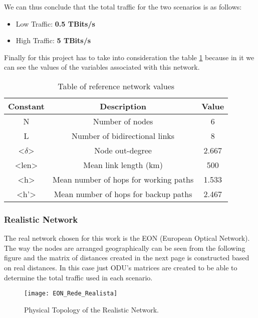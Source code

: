 We can thus conclude that the total traffic for the two scenarios is as follows:
\begin{itemize}
  \item Low Traffic: \textbf{0.5 TBits/s}
  \item High Traffic: \textbf{5 TBits/s}
\end{itemize}

Finally for this project has to take into consideration the table \ref{table:5} because in it we can see the values of the variables associated with this network.
\begin{table}[h!]
\centering
\begin{tabular}{|| c | c | c||}
 \hline
 Constant & Description & Value \\
 \hline\hline
 N & Number of nodes & 6 \\
 L & Number of bidirectional links & 8 \\
 <$\delta$> & Node out-degree & 2.667 \\
 <len> & Mean link length (km) & 500 \\
 <h> & Mean number of hops for working paths & 1.533 \\
 <h'> & Mean number of hops for backup paths & 2.467 \\
 \hline
\end{tabular}
\caption{Table of reference network values}
\label{table:5}
\end{table}

\subsubsection{Realistic Network}
The real network chosen for this work is the EON (European Optical Network).
The way the nodes are arranged geographically can be seen from the following figure and the matrix of distances created in the next page is constructed based on real distances.
In this case just ODU's matrices are created to be able to determine the total traffic used in each scenario.

\begin{figure}[h!]
\centering
\texttt{[image: EON\_Rede\_Realista]}
\caption{Physical Topology of the Realistic Network.}
\end{figure}


